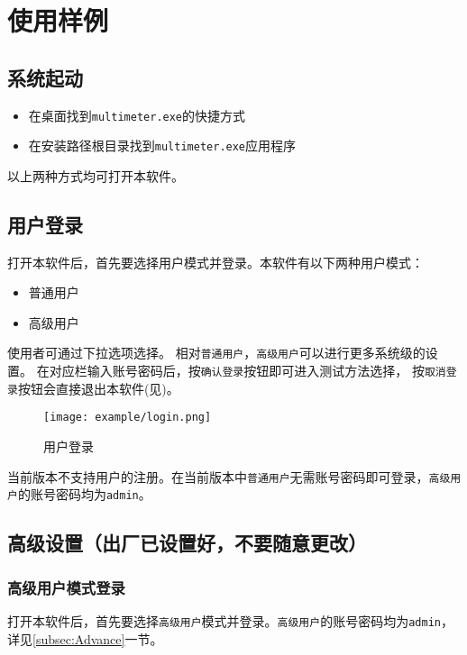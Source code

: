 \chapter{使用样例}
\section{系统起动}
\begin{itemize}
	\item 在桌面找到\lstinline{multimeter.exe}的快捷方式
	\item 在安装路径根目录找到\lstinline{multimeter.exe}应用程序
\end{itemize}
以上两种方式均可打开本软件。
\section{用户登录\label{subsec:Advance}}
打开本软件后，首先要选择用户模式并登录。本软件有以下两种用户模式：
\begin{itemize}
	\item 普通用户
	\item 高级用户
\end{itemize}
使用者可通过下拉选项选择。
相对\lstinline{普通用户}，\lstinline{高级用户}可以进行更多系统级的设置。
在对应栏输入账号密码后，按\lstinline{确认登录}按钮即可进入测试方法选择，
按\lstinline{取消登录}按钮会直接退出本软件(见)。
\begin{figure}[htbp]
	\centering
	\texttt{[image: example/login.png]}
	\caption{ 用户登录 \label{fig:exmp_login}}
\end{figure}
\begin{note}
	当前版本不支持用户的注册。在当前版本中\lstinline{普通用户}无需账号密码即可登录，\lstinline{高级用户}的账号密码均为\lstinline{admin}。
\end{note}






\section{高级设置（出厂已设置好，不要随意更改）}
\subsection{高级用户模式登录}
打开本软件后，首先要选择\lstinline{高级用户}模式并登录。\lstinline{高级用户}的账号密码均为\lstinline{admin}，
详见\ref{subsec:Advance}一节。
